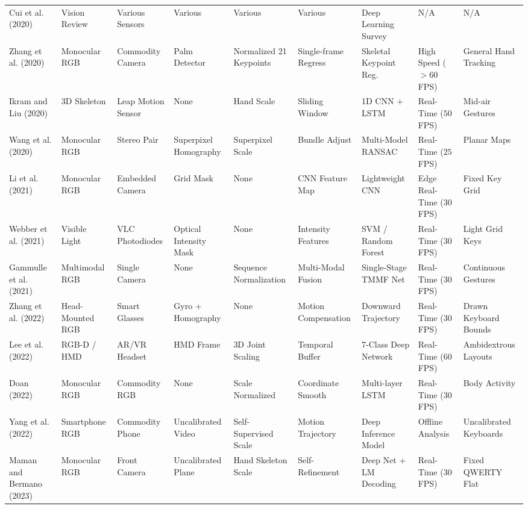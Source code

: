 \begin{table}[htbp]
\begin{tabular}{l l l l l l l l l}
Cui et al. (2020) \cite{Cui2020Deep} & Vision Review & Various Sensors & Various & Various & Various & Deep Learning Survey & N/A & N/A \\
Zhang et al. (2020) \cite{Zhang2020MediaPipe} & Monocular RGB & Commodity Camera & Palm Detector & Normalized 21 Keypoints & Single-frame Regress & Skeletal Keypoint Reg. & High Speed ($> 60$ FPS) & General Hand Tracking \\
Ikram and Liu (2020) \cite{Ikram2020Skeleton} & 3D Skeleton & Leap Motion Sensor & None & Hand Scale & Sliding Window & 1D CNN + LSTM & Real-Time ($50$ FPS) & Mid-air Gestures \\
Wang et al. (2020) \cite{Wang2020Relative} & Monocular RGB & Stereo Pair & Superpixel Homography & Superpixel Scale & Bundle Adjust & Multi-Model RANSAC & Real-Time ($25$ FPS) & Planar Maps \\
Li et al. (2021) \cite{Li2021CNN} & Monocular RGB & Embedded Camera & Grid Mask & None & CNN Feature Map & Lightweight CNN & Edge Real-Time ($30$ FPS) & Fixed Key Grid \\
Webber et al. (2021) \cite{Webber2021Finger} & Visible Light & VLC Photodiodes & Optical Intensity Mask & None & Intensity Features & SVM / Random Forest & Real-Time ($30$ FPS) & Light Grid Keys \\
Gammulle et al. (2021) \cite{Gammulle2021TMMF} & Multimodal RGB & Single Camera & None & Sequence Normalization & Multi-Modal Fusion & Single-Stage TMMF Net & Real-Time ($30$ FPS) & Continuous Gestures \\
Zhang et al. (2022) \cite{Zhang2022DynaKey} & Head-Mounted RGB & Smart Glasses & Gyro + Homography & None & Motion Compensation & Downward Trajectory & Real-Time ($30$ FPS) & Drawn Keyboard Bounds \\
Lee et al. (2022) \cite{Lee2022Virtual} & RGB-D / HMD & AR/VR Headset & HMD Frame & 3D Joint Scaling & Temporal Buffer & 7-Class Deep Network & Real-Time ($60$ FPS) & Ambidextrous Layouts \\
Doan (2022) \cite{Doan2022Efficient} & Monocular RGB & Commodity RGB & None & Scale Normalized & Coordinate Smooth & Multi-layer LSTM & Real-Time ($30$ FPS) & Body Activity \\
Yang et al. (2022) \cite{Yang2022Towards} & Smartphone RGB & Commodity Phone & Uncalibrated Video & Self-Supervised Scale & Motion Trajectory & Deep Inference Model & Offline Analysis & Uncalibrated Keyboards \\
Maman and Bermano (2023) \cite{Maman2023TypeNet} & Monocular RGB & Front Camera & Uncalibrated Plane & Hand Skeleton Scale & Self-Refinement & Deep Net + LM Decoding & Real-Time ($30$ FPS) & Fixed QWERTY Flat \\

\end{tabular}
\end{table}
